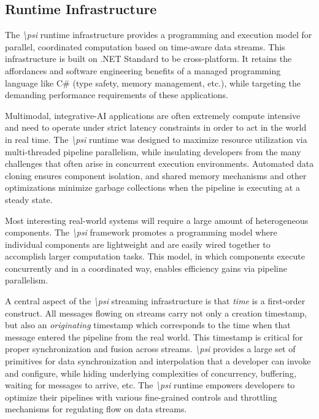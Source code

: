 \documentclass[letterpaper]{article}
\newcommand{\psif}{\emph{\textbackslash psi} }
\begin{document}
\subsection{Runtime Infrastructure}

The \psif runtime infrastructure provides a programming and execution model for parallel, coordinated computation based on time-aware data streams. This infrastructure is built on .NET Standard to be cross-platform. It retains the affordances and software engineering benefits of a managed programming language like C\# (type safety, memory management, etc.), while targeting the demanding performance requirements of these applications.

Multimodal, integrative-AI applications are often extremely compute intensive and need to operate under strict latency constraints in order to act in the world in real time. The \psif runtime was designed to maximize resource utilization via multi-threaded pipeline parallelism, while insulating developers from the many challenges that often arise in concurrent execution environments. Automated data cloning ensures component isolation, and shared memory mechanisms and other optimizations minimize garbage collections when the pipeline is executing at a steady state.

Most interesting real-world systems will require a large amount of heterogeneous components. The \psif framework promotes a programming model where individual components are lightweight and are easily wired together to accomplish larger computation tasks. This model, in which components execute concurrently and in a coordinated way, enables efficiency gains via pipeline parallelism.

A central aspect of the \psif streaming infrastructure is that \emph{time} is a first-order construct. All messages flowing on streams carry not only a creation timestamp, but also an \emph{originating} timestamp which corresponds to the time when that message entered the pipeline from the real world. This timestamp is critical for proper synchronization and fusion across streams. \psif provides a large set of primitives for data synchronization and interpolation that a developer can invoke and configure, while hiding underlying complexities of concurrency, buffering, waiting for messages to arrive, etc. The \psif runtime empowers developers to optimize their pipelines with various fine-grained controls and throttling mechanisms for regulating flow on data streams.
\end{document}
